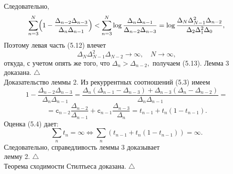 \documentclass[12pt,a4paper]{article}
\theoremstyle{plain}   \newtheorem{Pro}{Задача}
\begin{document}
Следовательно,
$$
  \sum _{n=3}^N \Bigl (
    1-\frac{\Delta _{n-2}\Delta _{n-3}}
	  {\Delta _n \Delta _{n-1}} \Bigr ) <
	    \sum _{n=3}^N \log
		  \frac{\Delta _n \Delta _{n-1}}
		    {\Delta _{n-2}\Delta _{n-3}}=
			  \log
			    \frac{\Delta _N \Delta _{N-1}^2 \Delta _{n-2}}
				  {\Delta _2 \Delta _1 ^2 \Delta _0} ,
$$
Поэтому левая часть (5.12) влечет
$$
  \Delta _N \Delta _{N-1}^2 \Delta _{N-2} \longrightarrow \infty ,
    \quad N \rightarrow \infty ,
$$
откуда, с учетом опять же того, что
$ \Delta _n > \Delta _{n-2} , $
получаем (5.13).
Лемма 3 доказана. $ \triangle $ \\
{\Large Доказательство леммы 2.}
Из рекуррентных соотношений (5.3) имеем
$$
  1-\frac{\Delta _{n-2}\Delta _{n-3}}
    {\Delta _n \Delta _{n-1}}=
	  \frac{\Delta _n (\Delta _{n-1}-\Delta _{n-3})+
	    \Delta _{n-3}(\Delta _n -\Delta _{n-2})}
		  {\Delta _n \Delta _{n-1}}=
$$
$$
  = \mathtt{c}_{n-2}\frac{\Delta _{n-2}}{\Delta _{n-1}}+
    \mathtt{c}_{n-1}\frac{\Delta _{n-3}}{\Delta _n} =
	  t_{n-1}+t_n (1-t_{n-1}).
$$
Оценка (5.4) дает:
$$
  \sum _n t_n =\infty \Longleftrightarrow
    \sum _n (t_{n-1}+t_n (1-t_{n-1}))=\infty .
$$
Следовательно, справедливость леммы 3 доказывает \\
лемму 2.
$ \triangle $ \\
Теорема сходимости Стилтьеса доказана. $ \triangle $
\newpage
\end{document}
